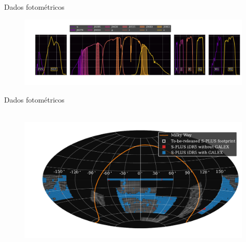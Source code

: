 

\begin{frame}[c]{Dados fotométricos}%
    \begin{figure}
        \centering
        \includegraphics[width=\linewidth]{script/images/transmission_curves_2.pdf}
    \end{figure}
\end{frame}

\begin{frame}[c]{Dados fotométricos}
    \begin{figure}
        \centering
        \includegraphics[height=7cm]{script/images/splus_footprint_idr5_GALEX.pdf}
    \end{figure}
\end{frame}

